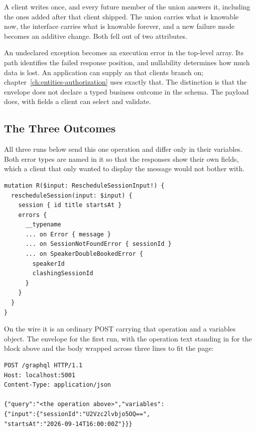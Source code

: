 %
A client writes  once, and every future member
of the union answers it, including the ones added after that client shipped.
The union carries what is knowable now, the interface carries what is knowable
forever, and a new failure mode becomes an additive change. Both fell out of
two attributes.

%
An undeclared exception becomes an execution error in the top-level
 array. Its path identifies the failed response position, and
nullability determines how much data is lost. An application can supply an
 that clients branch on; chapter~\ref{ch:entities-authorization}
uses exactly that. The distinction is that the envelope does not declare a
typed business outcome in the schema. The payload does, with fields a client
can select and validate.

\subsection{The Three Outcomes}

%
All three runs below send this one operation and differ only in their
variables. Both error types are named in it so that the responses show their
own fields, which a client that only wanted to display the message would not
bother with.

\begin{verbatim}
mutation R($input: RescheduleSessionInput!) {
  rescheduleSession(input: $input) {
    session { id title startsAt }
    errors {
      __typename
      ... on Error { message }
      ... on SessionNotFoundError { sessionId }
      ... on SpeakerDoubleBookedError {
        speakerId
        clashingSessionId
      }
    }
  }
}
\end{verbatim}

%
On the wire it is an ordinary POST carrying that operation and a variables
object. The envelope for the first run, with the operation text standing in
for the block above and the body wrapped across three lines to fit the page:

\begin{verbatim}
POST /graphql HTTP/1.1
Host: localhost:5001
Content-Type: application/json

{"query":"<the operation above>","variables":
{"input":{"sessionId":"U2Vzc2lvbjo5OQ==",
"startsAt":"2026-09-14T16:00:00Z"}}}
\end{verbatim}

